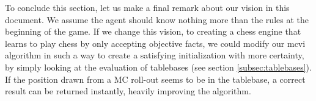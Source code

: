 To conclude this section, let us make a final remark about our vision in this document. We assume the agent should know nothing more than the rules at the beginning of the game. If we change this vision, to creating a chess engine that learns to play chess by only accepting objective facts, we could modify our \gls{mcvi} algorithm in such a way to create a satisfying initialization with more certainty, by simply looking at the evaluation of tablebases (see section \ref{subsec:tablebases}). If the position drawn from a MC roll-out seems to be in the tablebase, a correct result can be returned instantly, heavily improving the algorithm.